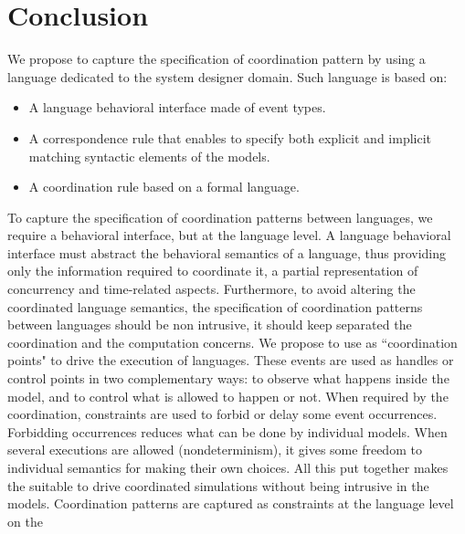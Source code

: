 \section{Conclusion}
We propose to capture the specification of coordination pattern by using a language dedicated to the system designer domain. Such language is based on:

\begin{itemize}
	\item A language behavioral interface made of event types. 
	\item A correspondence rule that enables to specify both explicit and implicit matching syntactic elements of the models. 
	\item A coordination rule based on a formal language. 
\end{itemize} 

To capture the specification of coordination patterns between languages, we require a behavioral interface, but at the language level. A language behavioral interface must abstract the behavioral semantics of a language, thus providing only the information required to coordinate it, \ie a partial representation of concurrency and time-related aspects. 
Furthermore, to avoid altering the coordinated language semantics, the specification of coordination patterns between languages should be non intrusive, \ie it should keep separated the coordination and the computation concerns. We propose to use \dse as ``coordination points" to drive the execution of languages. These events are used as handles or control points in two complementary ways: to observe what happens inside the model, and to control what is allowed to happen or not. When required by the coordination, constraints are used to forbid or delay some event occurrences. Forbidding occurrences reduces what can be done by individual models. When several executions are allowed
(nondeterminism), it gives some freedom to individual semantics for making their own choices. All this put together makes the \dse suitable to drive coordinated simulations without being intrusive in the models. Coordination patterns are captured as constraints at the language level on the \dse

